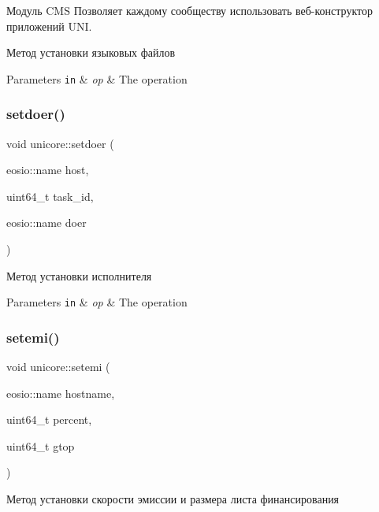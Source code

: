 Модуль C\+MS Позволяет каждому сообществу использовать веб-\/конструктор приложений U\+NI. 

Метод установки языковых файлов


\begin{DoxyParams}[1]{Parameters}
\mbox{\tt in}  & {\em op} & The operation \\
\hline
\end{DoxyParams}
\mbox{\label{classunicore_a4ff597c20fe7071fa4d48a1e6fb4e654}} 
\subsubsection{\texorpdfstring{setdoer()}{setdoer()}}
{\footnotesize\ttfamily void unicore\+::setdoer (\begin{DoxyParamCaption}\item[{eosio\+::name}]{host,  }\item[{uint64\+\_\+t}]{task\+\_\+id,  }\item[{eosio\+::name}]{doer }\end{DoxyParamCaption})}



Метод установки исполнителя 


\begin{DoxyParams}[1]{Parameters}
\mbox{\tt in}  & {\em op} & The operation \\
\hline
\end{DoxyParams}
\mbox{\label{classunicore_affa39993f35c8e2c8838a956c761cbcc}} 
\subsubsection{\texorpdfstring{setemi()}{setemi()}}
{\footnotesize\ttfamily void unicore\+::setemi (\begin{DoxyParamCaption}\item[{eosio\+::name}]{hostname,  }\item[{uint64\+\_\+t}]{percent,  }\item[{uint64\+\_\+t}]{gtop }\end{DoxyParamCaption})}



Метод установки скорости эмиссии и размера листа финансирования 



